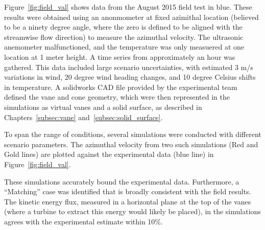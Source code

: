 Figure~\ref{fig:field_val} shows data from the August 2015 field test in
blue. These results were obtained using an anonmometer at fixed
azimithal location (believed to be a ninety degree angle, where the zero
is defined to be aligned with the streamwise flow direction) to measure the
azimuthal velocity. The ultrasonic 
anemometer malfunctioned, and the temperature was only measuered at one
location at 1 meter height. A time series from approximately an hour was
gathered. This data included large scenario uncertainties, with
estimated 3 m/s variations in wind, 20 degree wind heading changes, and
10 degree Celsius shifts in temperature. A solidworks CAD file provided
by the experimental team defined the vane and cone
geometry, which were then represented in the simulations as virtual
vanes and a solid surface, as described in 
Chapters~\ref{subsec:vane} and~\ref{subsec:solid_surface}.   

To span the range of conditions, several simulations were conducted
with different scenario parameters. The azimuthal velocity from two such
simulations (Red and Gold lines) are plotted against the experimental
data (blue line) in Figure~\ref{fig:field_val}.  

These simulations accurately bound the experimental data. Furthermore, a
``Matching'' case was identified that is broadly consistent with the
field results. The kinetic energy flux, measured in a horizontal plane
at the top of the vanes (where a turbine to extract this energy would
likely be placed), in the simulations agrees with the experimental
estimate within 10\%. 


%
% 
%
% 
%
%
%
%
